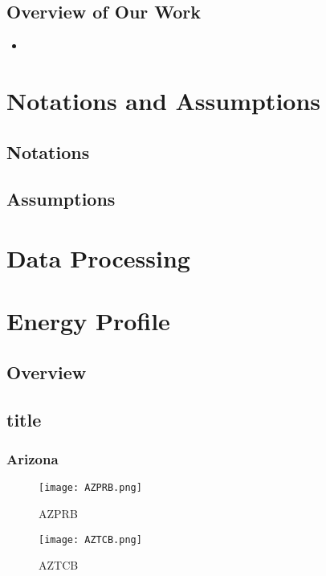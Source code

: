 \documentclass{mcmthesis}
\begin{document}
\subsection{Overview of Our Work}
\begin{itemize}
  \item 
\end{itemize}

\section{Notations and Assumptions}
\subsection{Notations}

\subsection{Assumptions}

\section{Data Processing}

\section{Energy Profile}
\subsection{Overview}

\cite{pr_guide}
\subsection{title}

\subsubsection{Arizona}
\begin{figure}[H]
\begin{minipage}[htb]{0.5\textwidth}
\centering
\texttt{[image: AZPRB.png]}
\caption{AZPRB} \label{fig:AZPRB}
\end{minipage}
\begin{minipage}[htb]{0.5\textwidth}
\centering
\texttt{[image: AZTCB.png]}
\caption{AZTCB} \label{fig:AZTCB}
\end{minipage}
\end{figure}
\end{document}
